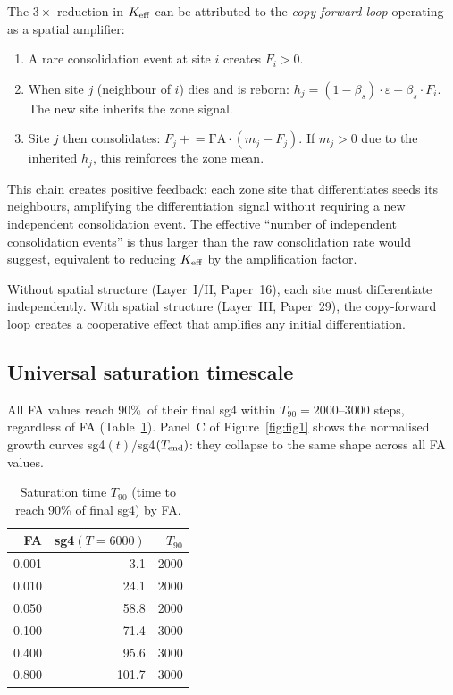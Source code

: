 \documentclass[11pt,a4paper]{article}
\begin{document}
The $3\times$ reduction in $K_{\rm eff}$ can be attributed to the
\emph{copy-forward loop} operating as a spatial amplifier:
\begin{enumerate}
  \item A rare consolidation event at site $i$ creates $F_i > 0$.
  \item When site $j$ (neighbour of $i$) dies and is reborn:
        $h_j = (1-\beta_s)\cdot\varepsilon + \beta_s\cdot F_i$.
        The new site inherits the zone signal.
  \item Site $j$ then consolidates: $F_j \mathrel{+}= \mathrm{FA}\cdot(m_j - F_j)$.
        If $m_j>0$ due to the inherited $h_j$, this reinforces the zone mean.
\end{enumerate}
This chain creates positive feedback: each zone site that differentiates
seeds its neighbours, amplifying the differentiation signal without requiring
a new independent consolidation event.
The effective ``number of independent consolidation events'' is thus larger
than the raw consolidation rate would suggest, equivalent to reducing
$K_{\rm eff}$ by the amplification factor.

Without spatial structure (Layer~I/II, Paper~16), each site must differentiate
independently.  With spatial structure (Layer~III, Paper~29), the copy-forward
loop creates a cooperative effect that amplifies any initial differentiation.

\subsection{Universal saturation timescale}

All FA values reach 90\%\ of their final sg4 within $T_{90}=2000$--$3000$ steps,
regardless of FA (Table~\ref{tab:t90}).
Panel~C of Figure~\ref{fig:fig1} shows the normalised growth curves
sg4$(t)$/sg4$(T_{\rm end})$: they collapse to the same shape across all FA values.

\begin{table}[h]
\centering
\small
\caption{Saturation time $T_{90}$ (time to reach 90\% of final sg4) by FA.}
\label{tab:t90}
\begin{tabular}{rrr}
\toprule
FA & sg4$(T=6000)$ & $T_{90}$ \\
\midrule
0.001 &   3.1 & 2000 \\
0.010 &  24.1 & 2000 \\
0.050 &  58.8 & 2000 \\
0.100 &  71.4 & 3000 \\
0.400 &  95.6 & 3000 \\
0.800 & 101.7 & 3000 \\
\bottomrule
\end{tabular}
\end{table}
\end{document}
